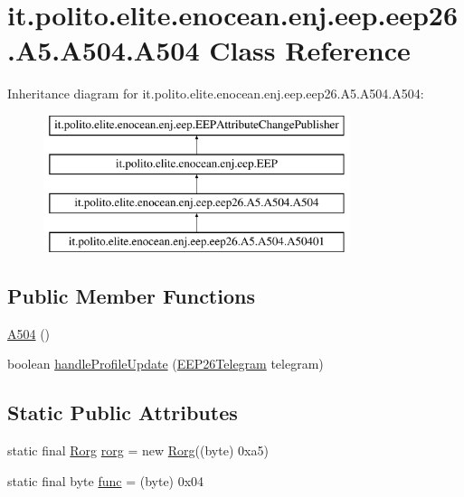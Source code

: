 \hypertarget{classit_1_1polito_1_1elite_1_1enocean_1_1enj_1_1eep_1_1eep26_1_1_a5_1_1_a504_1_1_a504}{}\section{it.\+polito.\+elite.\+enocean.\+enj.\+eep.\+eep26.\+A5.\+A504.\+A504 Class Reference}
\label{classit_1_1polito_1_1elite_1_1enocean_1_1enj_1_1eep_1_1eep26_1_1_a5_1_1_a504_1_1_a504}
Inheritance diagram for it.\+polito.\+elite.\+enocean.\+enj.\+eep.\+eep26.\+A5.\+A504.\+A504\+:\begin{figure}[H]
\begin{center}
\leavevmode
\includegraphics[height=4.000000cm]{classit_1_1polito_1_1elite_1_1enocean_1_1enj_1_1eep_1_1eep26_1_1_a5_1_1_a504_1_1_a504}
\end{center}
\end{figure}
\subsection*{Public Member Functions}
\begin{DoxyCompactItemize}
\item 
\hyperlink{classit_1_1polito_1_1elite_1_1enocean_1_1enj_1_1eep_1_1eep26_1_1_a5_1_1_a504_1_1_a504_ac72085d16d63f245d2ddf284f76371c1}{A504} ()
\item 
boolean \hyperlink{classit_1_1polito_1_1elite_1_1enocean_1_1enj_1_1eep_1_1eep26_1_1_a5_1_1_a504_1_1_a504_ab9ccb78070b1255607d6a05457753946}{handle\+Profile\+Update} (\hyperlink{classit_1_1polito_1_1elite_1_1enocean_1_1enj_1_1eep_1_1eep26_1_1telegram_1_1_e_e_p26_telegram}{E\+E\+P26\+Telegram} telegram)
\end{DoxyCompactItemize}
\subsection*{Static Public Attributes}
\begin{DoxyCompactItemize}
\item 
static final \hyperlink{classit_1_1polito_1_1elite_1_1enocean_1_1enj_1_1eep_1_1_rorg}{Rorg} \hyperlink{classit_1_1polito_1_1elite_1_1enocean_1_1enj_1_1eep_1_1eep26_1_1_a5_1_1_a504_1_1_a504_a4bd9f2a7aaf64037eec1625b5892ff1c}{rorg} = new \hyperlink{classit_1_1polito_1_1elite_1_1enocean_1_1enj_1_1eep_1_1_rorg}{Rorg}((byte) 0xa5)
\item 
static final byte \hyperlink{classit_1_1polito_1_1elite_1_1enocean_1_1enj_1_1eep_1_1eep26_1_1_a5_1_1_a504_1_1_a504_a7cb0e4912a6ceb26779be58fb653f043}{func} = (byte) 0x04
\end{DoxyCompactItemize}
